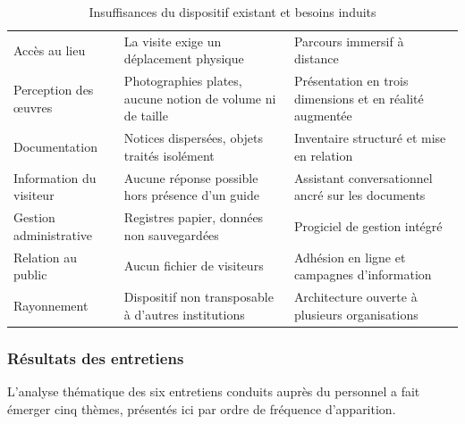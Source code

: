 \begin{table}[htbp]
\centering
\caption{Insuffisances du dispositif existant et besoins induits}
\label{tab:existant}
\small
\begin{tabularx}{\textwidth}{|L{4.4cm}|X|L{3.4cm}|}
\hline
{}
 &  &  \\ \hline
Accès au lieu & La visite exige un déplacement physique & Parcours immersif à distance \\ \hline
Perception des œuvres & Photographies plates, aucune notion de volume ni de taille & Présentation en trois dimensions et en réalité augmentée \\ \hline
Documentation & Notices dispersées, objets traités isolément & Inventaire structuré et mise en relation \\ \hline
Information du visiteur & Aucune réponse possible hors présence d'un guide & Assistant conversationnel ancré sur les documents \\ \hline
Gestion administrative & Registres papier, données non sauvegardées & Progiciel de gestion intégré \\ \hline
Relation au public & Aucun fichier de visiteurs & Adhésion en ligne et campagnes d'information \\ \hline
Rayonnement & Dispositif non transposable à d'autres institutions & Architecture ouverte à plusieurs organisations \\ \hline
\end{tabularx}
\end{table}

\subsubsection{Résultats des entretiens}

L'analyse thématique des six entretiens conduits auprès du personnel a fait
émerger cinq thèmes, présentés ici par ordre de fréquence d'apparition.

